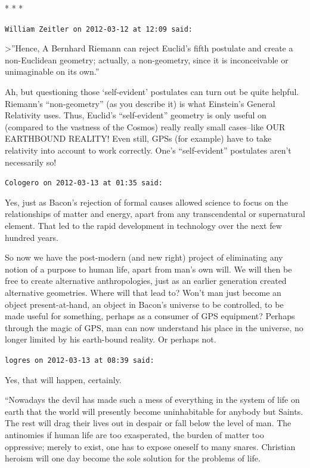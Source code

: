 
\begin{center}* * *\end{center}

\begin{footnotesize}
\begin{sffamily}
\texttt{William Zeitler on 2012-03-12 at 12:09 said:}

\textgreater''Hence, A Bernhard Riemann can reject Euclid's fifth postulate and create a non-Euclidean geometry; actually, a non-geometry, since it is inconceivable or unimaginable on its own.''

Ah, but questioning those `self-evident' postulates can turn out be quite helpful. Riemann's ``non-geometry'' (as you describe it) is what Einstein's General Relativity uses. Thus, Euclid's ``self-evident'' geometry is only useful on (compared to the vastness of the Cosmos) really really small cases--like OUR EARTHBOUND REALITY! Even still, GPSs (for example) have to take relativity into account to work correctly. One's ``self-evident'' postulates aren't necessarily so!

\hfill

\texttt{Cologero on 2012-03-13 at 01:35 said:}

Yes, just as Bacon's rejection of formal causes allowed science to focus on the relationships of matter and energy, apart from any transcendental or supernatural element. That led to the rapid development in technology over the next few hundred years.

So now we have the post-modern (and new right) project of eliminating any notion of a purpose to human life, apart from man's own will. We will then be free to create alternative anthropologies, just as an earlier generation created alternative geometries. Where will that lead to? Won't man just become an object present-at-hand, an object in Bacon's universe to be controlled, to be made useful for something, perhaps as a consumer of GPS equipment? Perhaps through the magic of GPS, man can now understand his place in the universe, no longer limited by his earth-bound reality. Or perhaps not.

\hfill

\texttt{logres on 2012-03-13 at 08:39 said:}

Yes, that will happen, certainly.

``Nowadays the devil has made such a mess of everything in the system of life on earth that the world will presently become uninhabitable for anybody but Saints. The rest will drag their lives out in despair or fall below the level of man. The antinomies if human life are too exasperated, the burden of matter too oppressive; merely to exist, one has to expose oneself to many snares. Christian heroism will one day become the sole solution for the problems of life.


\end{sffamily}
\end{footnotesize}
